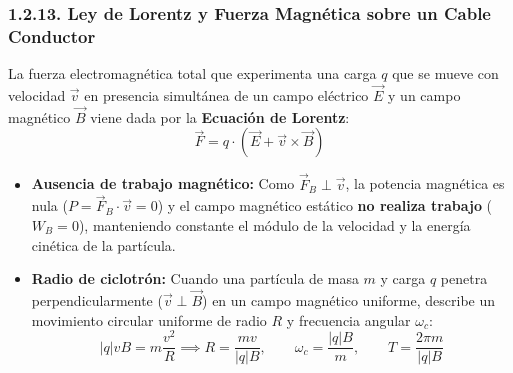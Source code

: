 \subsubsection{1.2.13. Ley de Lorentz y Fuerza Magnética sobre un Cable Conductor}

\begin{ley}
La fuerza electromagnética total que experimenta una carga $q$ que se mueve con velocidad $\vec{v}$ en presencia simultánea de un campo eléctrico $\vec{E}$ y un campo magnético $\vec{B}$ viene dada por la \textbf{Ecuación de Lorentz}:
\begin{equation}
    \vec{F} = q \cdot (\vec{E} + \vec{v} \times \vec{B})
\end{equation}
\begin{itemize}[leftmargin=*]
    \item \textbf{Ausencia de trabajo magnético:} Como $\vec{F}_B \perp \vec{v}$, la potencia magnética es nula ($P = \vec{F}_B\cdot\vec{v} = 0$) y el campo magnético estático \textbf{no realiza trabajo} ($W_B = 0$), manteniendo constante el módulo de la velocidad y la energía cinética de la partícula.
    \item \textbf{Radio de ciclotrón:} Cuando una partícula de masa $m$ y carga $q$ penetra perpendicularmente ($\vec{v} \perp \vec{B}$) en un campo magnético uniforme, describe un movimiento circular uniforme de radio $R$ y frecuencia angular $\omega_c$:
    \begin{equation}
        |q| v B = m \frac{v^2}{R} \implies R = \frac{m v}{|q| B}, \qquad \omega_c = \frac{|q| B}{m}, \qquad T = \frac{2\pi m}{|q| B}
    \end{equation}
\end{itemize}
\end{ley}

